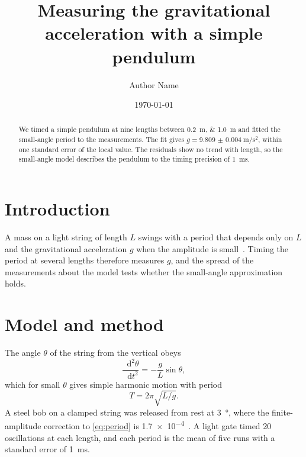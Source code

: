 \documentclass[aps,prb,reprint,superscriptaddress]{revtex4-2}
\newcommand{\dd}{\mathop{}\!\mathrm{d}}
\begin{document}
\title{Measuring the gravitational acceleration with a simple pendulum}
\author{Author Name}
\date{\today}

\begin{abstract}
We timed a simple pendulum at nine lengths between \qtylist{0.2;1.0}{\metre} and fitted the small-angle period to the measurements. The fit gives $g = \qty{9.809(4)}{\metre\per\second\squared}$, within one standard error of the local value. The residuals show no trend with length, so the small-angle model describes the pendulum to the timing precision of \qty{1}{\milli\second}.
\end{abstract}

\maketitle

\section{Introduction}

A mass on a light string of length $L$ swings with a period that depends only on $L$ and the gravitational acceleration $g$ when the amplitude is small~\cite{nelson1986}. Timing the period at several lengths therefore measures $g$, and the spread of the measurements about the model tests whether the small-angle approximation holds.

\section{Model and method}

The angle $\theta$ of the string from the vertical obeys
\begin{equation}
  \frac{\dd^2\theta}{\dd t^2} = -\frac{g}{L} \sin\theta ,
  \label{eq:motion}
\end{equation}
which for small $\theta$ gives simple harmonic motion with period
\begin{equation}
  T = 2\pi \sqrt{L/g} .
  \label{eq:period}
\end{equation}
A steel bob on a clamped string was released from rest at \qty{3}{\degree}, where the finite-amplitude correction to \cref{eq:period} is \num{1.7e-4}~\cite{nelson1986}. A light gate timed 20 oscillations at each length, and each period is the mean of five runs with a standard error of \qty{1}{\milli\second}.
\end{document}
